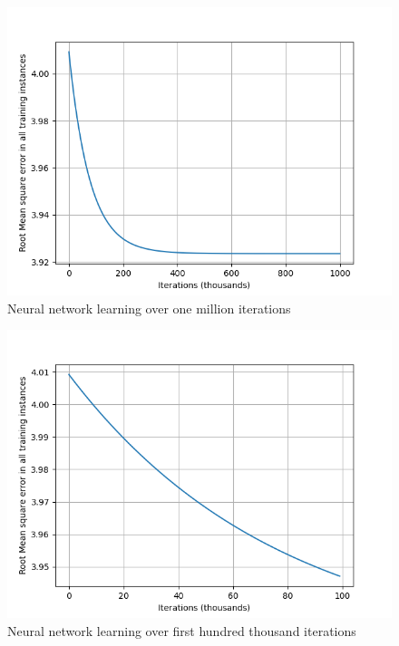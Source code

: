 \documentclass[11pt]{article}
\begin{document}
	 \begin{figure}[!htb]
	 	\centering
	 		\includegraphics{Resources/PartTwo/FullTrainingData_20220128_124029_.png}
	 		\caption{Neural network learning over one million iterations}
	 		\label{Img:NNTrainA}
	 \end{figure}
 
 \begin{figure}[!htb]
 	\centering
 	\includegraphics{Resources/PartTwo/LearningGraphs/ActualRun/20220128_020003_1000_1.png}
 	\caption{Neural network learning over first hundred thousand iterations}
 	\label{Img:NNTrainB}
 \end{figure}
\end{document}
